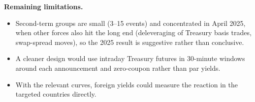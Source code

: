 \documentclass[11pt]{article}
\begin{document}
\textbf{Remaining limitations.}
\begin{itemize}[nosep]
\item Second-term groups are small (3--15 events) and concentrated in April
2025, when other forces also hit the long end (deleveraging of Treasury
basis trades, swap-spread moves), so the 2025 result is suggestive rather
than conclusive.
\item A cleaner design would use intraday Treasury futures in 30-minute
windows around each announcement and zero-coupon rather than par yields.
\item With the relevant curves, foreign yields could measure the reaction in
the targeted countries directly.
\end{itemize}
\end{document}
